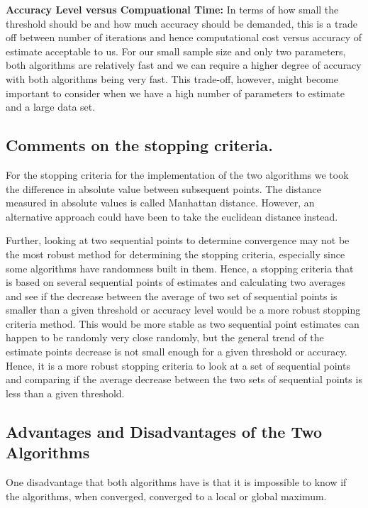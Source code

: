 \documentclass[]{article}
\begin{document}
\textbf{Accuracy Level versus Compuational Time:} In terms of how small
the threshold should be and how much accuracy should be demanded, this
is a trade off between number of iterations and hence computational cost
versus accuracy of estimate acceptable to us. For our small sample size
and only two parameters, both algorithms are relatively fast and we can
require a higher degree of accuracy with both algorithms being very
fast. This trade-off, however, might become important to consider when
we have a high number of parameters to estimate and a large data set.

\subsection{Comments on the stopping
criteria.}\label{comments-on-the-stopping-criteria.}

For the stopping criteria for the implementation of the two algorithms
we took the difference in absolute value between subsequent points. The
distance measured in absolute values is called Manhattan distance.
However, an alternative approach could have been to take the euclidean
distance instead.

Further, looking at two sequential points to determine convergence may
not be the most robust method for determining the stopping criteria,
especially since some algorithms have randomness built in them. Hence, a
stopping criteria that is based on several sequential points of
estimates and calculating two averages and see if the decrease between
the average of two set of sequential points is smaller than a given
threshold or accuracy level would be a more robust stopping criteria
method. This would be more stable as two sequential point estimates can
happen to be randomly very close randomly, but the general trend of the
estimate points decrease is not small enough for a given threshold or
accuracy. Hence, it is a more robust stopping criteria to look at a set
of sequential points and comparing if the average decrease between the
two sets of sequential points is less than a given threshold.

\subsection{Advantages and Disadvantages of the Two
Algorithms}\label{advantages-and-disadvantages-of-the-two-algorithms}

One disadvantage that both algorithms have is that it is impossible to
know if the algorithms, when converged, converged to a local or global
maximum.
\end{document}

